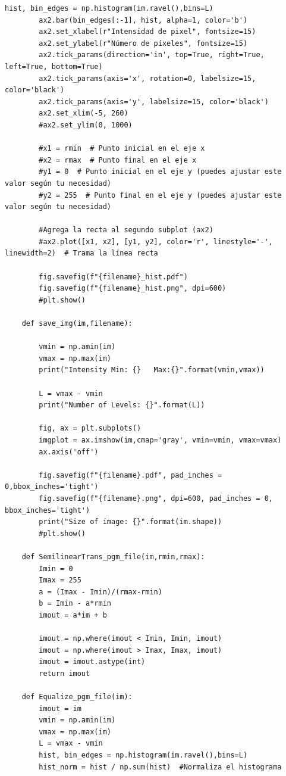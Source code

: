 \documentclass[letterpaper,12pt]{article}
\theoremstyle{plain}
\begin{document}
\begin{onecolumn}
\begin{lstlisting}[style=mystyle]
        hist, bin_edges = np.histogram(im.ravel(),bins=L)
        ax2.bar(bin_edges[:-1], hist, alpha=1, color='b')
        ax2.set_xlabel(r"Intensidad de pixel", fontsize=15)
        ax2.set_ylabel(r"Número de píxeles", fontsize=15)
        ax2.tick_params(direction='in', top=True, right=True, left=True, bottom=True)
        ax2.tick_params(axis='x', rotation=0, labelsize=15, color='black')
        ax2.tick_params(axis='y', labelsize=15, color='black')
        ax2.set_xlim(-5, 260)
        #ax2.set_ylim(0, 1000)
    
        #x1 = rmin  # Punto inicial en el eje x
        #x2 = rmax  # Punto final en el eje x
        #y1 = 0  # Punto inicial en el eje y (puedes ajustar este valor según tu necesidad)
        #y2 = 255  # Punto final en el eje y (puedes ajustar este valor según tu necesidad)
    
        #Agrega la recta al segundo subplot (ax2)
        #ax2.plot([x1, x2], [y1, y2], color='r', linestyle='-', linewidth=2)  # Trama la línea recta
    
        fig.savefig(f"{filename}_hist.pdf")
        fig.savefig(f"{filename}_hist.png", dpi=600)
        #plt.show()
    
    def save_img(im,filename):
        
        vmin = np.amin(im)
        vmax = np.max(im)
        print("Intensity Min: {}   Max:{}".format(vmin,vmax))
    
        L = vmax - vmin
        print("Number of Levels: {}".format(L))
    
        fig, ax = plt.subplots()
        imgplot = ax.imshow(im,cmap='gray', vmin=vmin, vmax=vmax)
        ax.axis('off')
    
        fig.savefig(f"{filename}.pdf", pad_inches = 0,bbox_inches='tight')
        fig.savefig(f"{filename}.png", dpi=600, pad_inches = 0, bbox_inches='tight')
        print("Size of image: {}".format(im.shape))
        #plt.show()
    
    def SemilinearTrans_pgm_file(im,rmin,rmax):
        Imin = 0
        Imax = 255
        a = (Imax - Imin)/(rmax-rmin)
        b = Imin - a*rmin  
        imout = a*im + b
    
        imout = np.where(imout < Imin, Imin, imout)
        imout = np.where(imout > Imax, Imax, imout)
        imout = imout.astype(int)
        return imout
    
    def Equalize_pgm_file(im):
        imout = im 
        vmin = np.amin(im)
        vmax = np.max(im)
        L = vmax - vmin
        hist, bin_edges = np.histogram(im.ravel(),bins=L)
        hist_norm = hist / np.sum(hist)  #Normaliza el histograma
    

\end{lstlisting}
\end{onecolumn}
\end{document}
